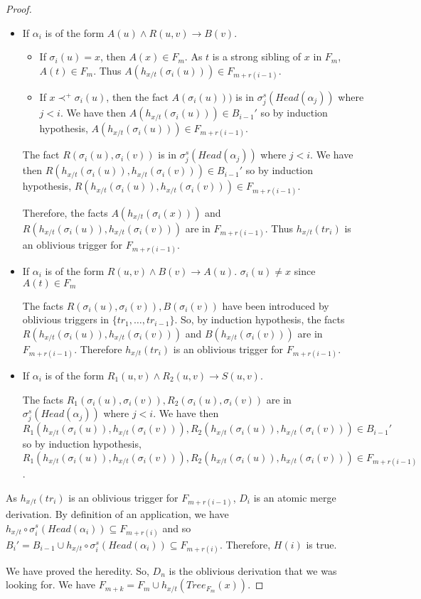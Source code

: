 \documentclass{article}
\theoremstyle{definition}
\theoremstyle{remark}
\newcommand{\Tree}{\textit{Tree}}
\begin{document}
\begin{proof}
\begin{itemize}
\item If $\alpha_i$ is of the form $A(u) \wedge R(u,v) \rightarrow B(v)$.
	\begin{itemize}
		\item If $\sigma_i(u) = x$, then $A(x) \in F_m$. As $t$ is a strong sibling of $x$ in $F_m$, $A(t)\in F_m$. Thus $A(h_{x/t}(\sigma_i(u))) \in F_{m+r(i-1)}$.
		\item If $x \prec^+ \sigma_i(u)$, then the fact $A(\sigma_i(u)))$ is in $\sigma_j^s(Head(\alpha_j))$ where $j<i$. We have then $A(h_{x/t}(\sigma_i(u)))\in B_{i-1}'$ so by induction hypothesis, $A(h_{x/t}(\sigma_i(u)))\in F_{m+r(i-1)}$. 
		\end{itemize}
The fact $R(\sigma_i(u),\sigma_i(v))$ is in $\sigma_j^s(Head(\alpha_j))$ where $j<i$. We have then $R(h_{x/t}(\sigma_i(u)),h_{x/t}(\sigma_i(v)))\in B_{i-1}'$ so by induction hypothesis, $R(h_{x/t}(\sigma_i(u)),h_{x/t}(\sigma_i(v)))\in F_{m+r(i-1)}$. 		

Therefore, the facts $A(h_{x/t}(\sigma_i(x)))$ and $R(h_{x/t}(\sigma_i(u)),h_{x/t}(\sigma_i(v)))$ are in $ F_{m+r(i-1)}$. Thus $h_{x/t}(tr_{i})$ is an oblivious trigger for $F_{m+r(i-1)}$.
\item If $\alpha_i$ is of the form $R(u,v) \wedge B(v) \rightarrow A(u)$. $\sigma_i(u) \neq x$ since $A(t) \in F_{m}$

The facts $R(\sigma_i(u),\sigma_i(v)),B(\sigma_i(v))$ have been introduced by oblivious triggers in $\{tr_1,\ldots,tr_{i-1}\}$. So, by induction hypothesis, the facts $R(h_{x/t}(\sigma_i(u)),h_{x/t}(\sigma_i(v)))$ and $B(h_{x/t}(\sigma_i(v)))$ are in $ F_{m+r(i-1)}$. Therefore $h_{x/t}(tr_{i})$ is an oblivious trigger for $F_{m+r(i-1)}$.
\item If $\alpha_i$ is of the form $R_1(u,v) \wedge R_2(u,v) \rightarrow S(u,v)$.

The facts $R_1(\sigma_i(u),\sigma_i(v)),R_2(\sigma_i(u),\sigma_i(v))$ are in $\sigma_j^s(Head(\alpha_j))$ where $j<i$. We have then $R_1(h_{x/t}(\sigma_i(u)),h_{x/t}(\sigma_i(v))),R_2(h_{x/t}(\sigma_i(u)),h_{x/t}(\sigma_i(v)))\in B_{i-1}'$ so by induction hypothesis, $R_1(h_{x/t}(\sigma_i(u)),h_{x/t}(\sigma_i(v))),R_2(h_{x/t}(\sigma_i(u)),h_{x/t}(\sigma_i(v)))\in F_{m+r(i-1)}$. 



	\end{itemize} 

As $h_{x/t}(tr_{i})$ is an oblivious trigger for $F_{m+r(i-1)}$, $D_i$ is an atomic merge derivation. By definition of an application, we have $h_{x/t} \circ \sigma_i^s(Head(\alpha_i)) \subseteq F_{m+r(i)}$ and so $B_i' = B_{i-1} \cup h_{x/t} \circ \sigma_i^s(Head(\alpha_i)) 	\subseteq F_{m+r(i)}$.
Therefore, $H(i)$ is true.


We have proved the heredity. So, $D_n$ is the oblivious derivation that we was looking for. We have $F_{m+k} = F_m \cup h_{x/t}(\Tree_{F_m}(x))$.

\end{proof}
\end{document}

